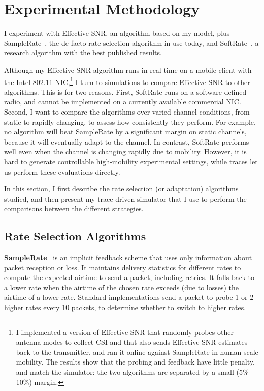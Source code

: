 \section{Experimental Methodology}
I experiment with Effective SNR, an algorithm based on my model, plus SampleRate~\cite{Bicket_SampleRate}, the de facto rate selection algorithm in use today, and SoftRate~\cite{Vutukuru_SoftRate}, a research algorithm with the best published results.

Although my Effective SNR algorithm runs in real time on a mobile client with the Intel 802.11 NIC,\footnote{I implemented a version of Effective SNR that randomly probes other antenna modes to collect CSI and that also sends Effective SNR estimates back to the transmitter, and ran it online against SampleRate in human-scale mobility. The results show that the probing and feedback have little penalty, and match the simulator: the two algorithms are separated by a small (5\%--10\%) margin.} I turn to simulations to compare Effective SNR to other algorithms. This is for two reasons. First, SoftRate runs on a software-defined radio, and cannot be implemented on a currently available commercial NIC. Second, I want to compare the algorithms over varied channel conditions, from static to rapidly changing, to assess how consistently they perform. 
For example, no algorithm will beat SampleRate by a significant margin on static channels, because it will eventually adapt to the channel. In contrast, SoftRate performs well even when the channel is changing rapidly due to mobility. However, it is hard to generate controllable high-mobility experimental settings, while traces let us perform these evaluations directly.

In this section, I first describe the rate selection (or adaptation) algorithms studied, and then present my trace-driven simulator that I use to perform the comparisons between the different strategies.

\subsection{Rate Selection Algorithms}
\textbf{SampleRate}~\cite{Bicket_SampleRate} is an implicit feedback scheme that uses only information about packet reception or loss.
It maintains delivery statistics for different rates to compute the expected airtime to send a packet, including retries.
It falls back to a lower rate when the airtime of the chosen rate exceeds (due to losses) the airtime of a lower rate.
Standard implementations send a packet to probe 1 or 2 higher rates every 10 packets, to determine whether to switch to higher rates.


